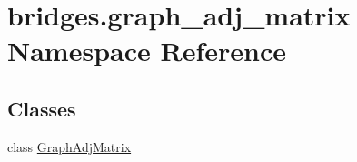 \hypertarget{namespacebridges_1_1graph__adj__matrix}{}\section{bridges.\+graph\+\_\+adj\+\_\+matrix Namespace Reference}
\label{namespacebridges_1_1graph__adj__matrix}
\subsection*{Classes}
\begin{DoxyCompactItemize}
\item 
class \hyperlink{classbridges_1_1graph__adj__matrix_1_1_graph_adj_matrix}{Graph\+Adj\+Matrix}
\end{DoxyCompactItemize}
